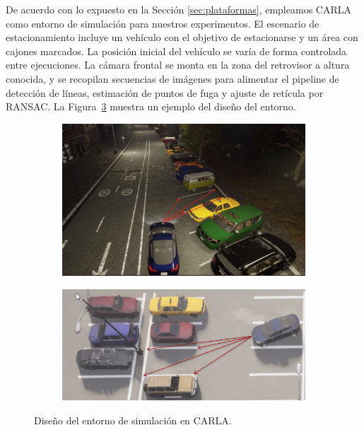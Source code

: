 \noindent
De acuerdo con lo expuesto en la Sección \ref{sec:plataformas},
empleamos CARLA como entorno de simulación para nuestros experimentos.
El escenario de estacionamiento incluye un vehículo con el objetivo de estacionarse y un área con cajones marcados.
La posición inicial del vehículo se varía de forma controlada entre ejecuciones.
La cámara frontal se monta en la zona del retrovisor a altura conocida,
y se recopilan secuencias de imágenes para alimentar el pipeline de detección de líneas,
estimación de puntos de fuga y ajuste de retícula por RANSAC.
La Figura~\ref{fig:simulation-design} muestra un ejemplo del diseño del entorno.

\begin{figure}[!ht]
    \centering
    \begin{subfigure}{0.4\textwidth}
        \includegraphics[width=\textwidth]{img/distances}\label {fig:distances}
    \end{subfigure}
    \begin{subfigure}{0.4\textwidth}
        \includegraphics[width=\textwidth]{img/distances2}\label {fig:distances2}
    \end{subfigure}

    \caption{Diseño del entorno de simulación en CARLA.}
    \label{fig:simulation-design}
\end{figure}

